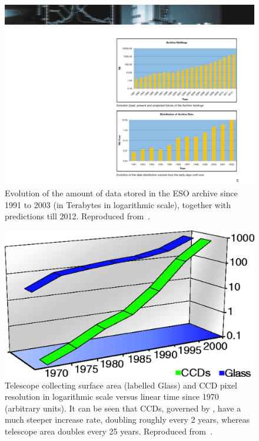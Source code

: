 	\begin{figure}[btp]
		\centering
		\includegraphics[scale=1]
				{fig/ESODataHoldings.pdf}
		\caption[Evolution of the
		         ESO data holdings]
		{
			Evolution of the amount of data stored in the ESO
			archive since 1991 to 2003 (in Terabytes in logarithmic
			scale), together with predictions till 2012.
			Reproduced from~\cite{ESO:2003la}.
		}
		\label{fig:fig_ESODataHoldings}
	\end{figure}

	\begin{figure}[btp]
		\centering
		\includegraphics[width=0.8\columnwidth]
		     {fig/CCDresolutionIncrease.jpg}
		\caption[Evolution of telescope areas and CCD pixel resolution]
		{
			Telescope collecting surface area (labelled Glass) and
			CCD pixel resolution in logarithmic scale versus linear
			time since 1970 (arbitrary units). It can be seen that
			CCDs, governed by , have a
			much steeper increase rate, doubling roughly every 2
			years, whereas telescope area doubles every 25 years.
			Reproduced from~\cite{2001Sci...293.2037S}.
		}
		\label{fig:fig_CCDresolutionIncrease}
	\end{figure}

